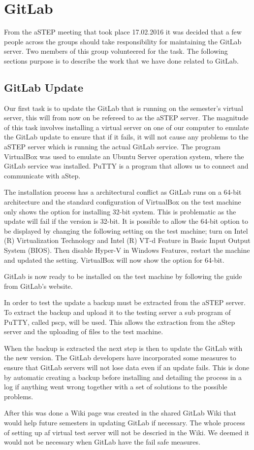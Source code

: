 \section{GitLab}
From the aSTEP meeting that took place 17.02.2016 it was decided that a few people across the groups should take responsibility for maintaining the GitLab server. Two members of this group volunteered for the task. The following sections purpose is to describe the work that we have done related to GitLab.

\subsection{GitLab Update}
Our first task is to update the GitLab that is running on the semester's virtual server, this will from now on be refereed to as the aSTEP server. The magnitude of this task involves installing a virtual server on one of our computer to emulate the GitLab update to ensure that if it fails, it will not cause any problems to the aSTEP server which is running the actual GitLab service. The program VirtualBox\cite{vbox} was used to emulate an Ubuntu Server operation system, where the GitLab service was installed. PuTTY\cite{putty}  is a program that allows us to connect and communicate with aStep.

The installation process has a architectural conflict as GitLab runs on a 64-bit architecture and the standard configuration of VirtualBox on the test machine only shows the option for installing 32-bit system. This is problematic as the update will fail if the version is 32-bit. It is possible to allow the 64-bit option to be displayed by changing the following setting on the test machine; turn on Intel (R) Virtualization Technology and Intel (R) VT-d Feature in Basic Input Output System (BIOS). Then disable Hyper-V in Windows Features, restart the machine and updated the setting. VirtualBox will now show the option for 64-bit.

GitLab is now ready to be installed on the test machine by following the guide from GitLab's website\cite{gitlab_guide}.

In order to test the update a backup must be extracted from the aSTEP server. To extract the backup and upload it to the testing server a sub program of PuTTY, called pscp, will be used. This allows the extraction from the aStep server and the uploading of files to the test machine.

When the backup is extracted the next step is then to update the GitLab with the new version. The GitLab developers have incorporated some measures to ensure that GitLab servers will not lose data even if an update fails. This is done by automatic creating a backup before installing and detailing the process in a log if anything went wrong together with a set of solutions to the possible problems.

After this was done a Wiki page was created in the shared GitLab Wiki that would help future semesters in updating GitLab if necessary. The whole process of setting up af virtual test server will not be descried in the Wiki. We deemed it would not be necessary when GitLab have the fail safe measures.